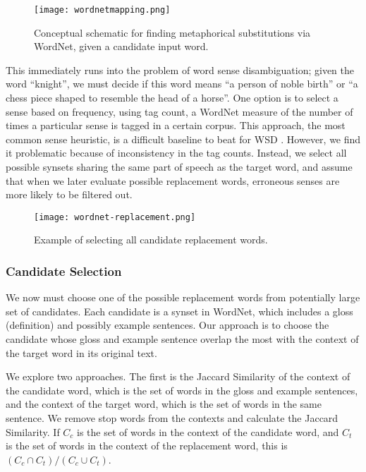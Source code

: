 \documentclass[12pt]{article}
\begin{document}
\begin{figure}[h]
	\centering
	\texttt{[image: wordnetmapping.png]}
	\caption{Conceptual schematic for finding metaphorical substitutions via WordNet, given a candidate input word.}
	\label{fig:wnmapping}
\end{figure}

This immediately runs into the problem of word sense disambiguation; given the word ``knight'', we must decide if this word means ``a person of noble birth'' or ``a chess piece shaped to resemble the head of a horse''. One option is to select a sense based on frequency, using tag count, a WordNet measure of the number of times a particular sense is tagged in a certain corpus. This approach, the most common sense heuristic, is a difficult baseline to beat for WSD \cite{mccarthy}. However, we find it problematic because of inconsistency in the tag counts. Instead, we select all possible synsets sharing the same part of speech as the target word, and assume that when we later evaluate possible replacement words, erroneous senses are more likely to be filtered out.

\begin{figure}[h]
	\centering
	\texttt{[image: wordnet-replacement.png]}
	\caption{Example of selecting all candidate replacement words.}
	\label{fig:wnmapexample}
\end{figure}

\subsubsection{Candidate Selection}

We now must choose one of the possible replacement words from potentially large set of candidates. Each candidate is a synset in WordNet, which includes a gloss (definition) and possibly example sentences. Our approach is to choose the candidate whose gloss and example sentence overlap the most with the context of the target word in its original text.

We explore two approaches. The first is the Jaccard Similarity of the context of the candidate word, which is the set of words in the gloss and example sentences, and the context of the target word, which is the set of words in the same sentence. We remove stop words from the contexts and calculate the Jaccard Similarity. If $C_c$ is the set of words in the context of the candidate word, and $C_t$ is the set of words in the context of the replacement word, this is $(C_c \cap C_t) / (C_c \cup C_t)$.
\end{document}
